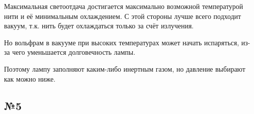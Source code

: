 Максимальная светоотдача достигается максимально возможной температурой нити и её минимальным охлаждением. С этой стороны лучше всего подходит вакуум, т.к. нить будет охлаждаться только за счёт излучения.

Но вольфрам в вакууме при высоких температурах может начать испаряться, из-за чего уменьшается долговечность лампы.

Поэтому лампу заполняют каким-либо инертным газом, но давление выбирают как можно ниже.

\subsection{№5}


\begin{figure}[H]
\begin{minipage}[H]{0.49\linewidth}
\end{minipage}
\hfill
\begin{minipage}[H]{0.49\linewidth}

\end{minipage}
\end{figure}
